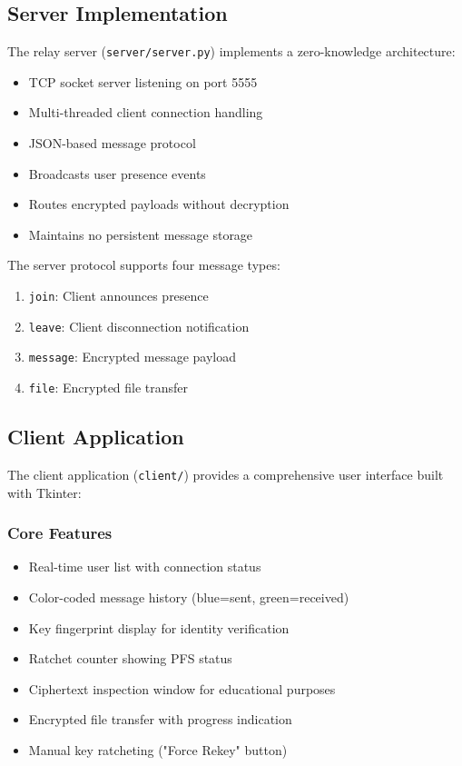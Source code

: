 \documentclass[conference]{IEEEtran}
\begin{document}
\subsection{Server Implementation}

The relay server (\texttt{server/server.py}) implements a zero-knowledge architecture:

\begin{itemize}
    \item TCP socket server listening on port 5555
    \item Multi-threaded client connection handling
    \item JSON-based message protocol
    \item Broadcasts user presence events
    \item Routes encrypted payloads without decryption
    \item Maintains no persistent message storage
\end{itemize}

The server protocol supports four message types:

\begin{enumerate}
    \item \texttt{join}: Client announces presence
    \item \texttt{leave}: Client disconnection notification
    \item \texttt{message}: Encrypted message payload
    \item \texttt{file}: Encrypted file transfer
\end{enumerate}

\subsection{Client Application}

The client application (\texttt{client/}) provides a comprehensive user interface built with Tkinter:

\subsubsection{Core Features}
\begin{itemize}
    \item Real-time user list with connection status
    \item Color-coded message history (blue=sent, green=received)
    \item Key fingerprint display for identity verification
    \item Ratchet counter showing PFS status
    \item Ciphertext inspection window for educational purposes
    \item Encrypted file transfer with progress indication
    \item Manual key ratcheting ("Force Rekey" button)
\end{itemize}
\end{document}
